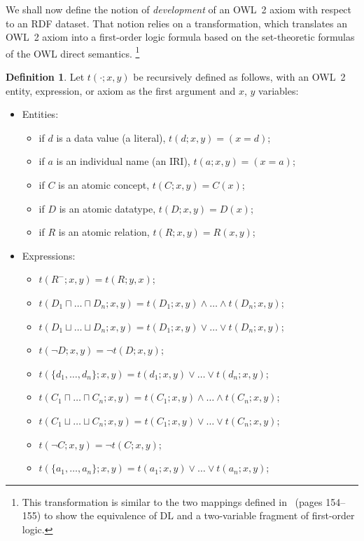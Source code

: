 \documentclass[review]{elsarticle}
\theoremstyle{definition}
\newtheorem{definition}{Definition}
\begin{document}
We shall now define the notion of \emph{development} of an OWL~2 axiom
with respect to an RDF dataset. That notion relies on a transformation,
which translates an OWL~2 axiom into a first-order logic formula based on the
set-theoretic formulas of the OWL direct semantics.%
\footnote{This transformation is similar to the two mappings defined in~\cite{DLHandbook2003}
(pages 154--155) to show the equivalence of DL and a two-variable fragment
of first-order logic.}

\begin{definition}\label{def:FOL-transform}
  Let $t(\cdot; x, y)$ be recursively defined as follows, with an OWL~2
  entity, expression, or axiom as the first argument
  and $x$, $y$ variables:
  \begin{itemize}
  \item Entities:
    \begin{itemize}
    \item if $d$ is a data value (a literal), $t(d; x, y) = (x = d)$;
    \item if $a$ is an individual name (an IRI), $t(a; x, y) = (x = a)$;
    \item if $C$ is an atomic concept, $t(C; x, y) = C(x)$;
    \item if $D$ is an atomic datatype, $t(D; x, y) = D(x)$;
    \item if $R$ is an atomic relation, $t(R; x, y) = R(x, y)$;
    \end{itemize}
  \item Expressions:
    \begin{itemize}
    \item $t(R^-; x, y) = t(R; y, x)$;
    \item $t(D_1 \sqcap \ldots \sqcap D_n; x, y) = t(D_1; x, y) \land \ldots \land t(D_n; x, y)$;
    \item $t(D_1 \sqcup \ldots \sqcup D_n; x, y) = t(D_1; x, y) \lor \ldots \lor t(D_n; x, y)$;
    \item $t(\neg D; x, y) = \neg t(D; x, y)$;
    \item $t(\{d_1, \ldots, d_n\}; x, y) = t(d_1; x, y) \lor \ldots \lor t(d_n; x, y)$;
    \item $t(C_1 \sqcap \ldots \sqcap C_n; x, y) = t(C_1; x, y) \land \ldots \land t(C_n; x, y)$;
  \item $t(C_1 \sqcup \ldots \sqcup C_n; x, y) = t(C_1; x, y) \lor \ldots \lor t(C_n; x, y)$;
  \item $t(\neg C; x, y) = \neg t(C; x, y)$;
  \item $t(\{a_1, \ldots, a_n\}; x, y) = t(a_1; x, y) \lor \ldots \lor t(a_n; x, y)$;

\end{itemize}
\end{itemize}
\end{definition}
\end{document}
